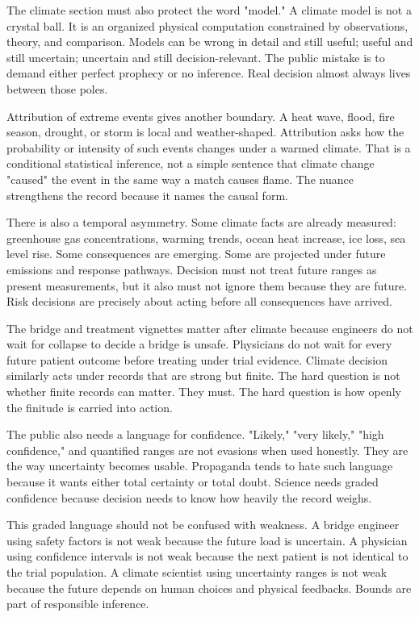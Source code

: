 The climate section must also protect the word "model." A climate model is not
a crystal ball. It is an organized physical computation constrained by
observations, theory, and comparison. Models can be wrong in detail and still
useful; useful and still uncertain; uncertain and still decision-relevant.
The public mistake is to demand either perfect prophecy or no inference. Real
decision almost always lives between those poles.

Attribution of extreme events gives another boundary. A heat wave, flood,
fire season, drought, or storm is local and weather-shaped. Attribution asks
how the probability or intensity of such events changes under a warmed
climate. That is a conditional statistical inference, not a simple sentence
that climate change "caused" the event in the same way a match causes flame.
The nuance strengthens the record because it names the causal form.

There is also a temporal asymmetry. Some climate facts are already measured:
greenhouse gas concentrations, warming trends, ocean heat increase, ice loss,
sea level rise. Some consequences are emerging. Some are projected under
future emissions and response pathways. Decision must not treat future ranges
as present measurements, but it also must not ignore them because they are
future. Risk decisions are precisely about acting before all consequences
have arrived.

The bridge and treatment vignettes matter after climate because engineers do
not wait for collapse to decide a bridge is unsafe.
Physicians do not wait for every future patient outcome before treating under
trial evidence. Climate decision similarly acts under records that are strong
but finite. The hard question is not whether finite records can matter. They
must. The hard question is how openly the finitude is carried into action.

The public also needs a language for confidence. "Likely," "very likely,"
"high confidence," and quantified ranges are not evasions when used honestly.
They are the way uncertainty becomes usable. Propaganda tends to hate such
language because it wants either total certainty or total doubt. Science needs
graded confidence because decision needs to know how heavily the record
weighs.

This graded language should not be confused with weakness. A bridge engineer
using safety factors is not weak because the future load is uncertain. A
physician using confidence intervals is not weak because the next patient is
not identical to the trial population. A climate scientist using uncertainty
ranges is not weak because the future depends on human choices and physical
feedbacks. Bounds are part of responsible inference.

